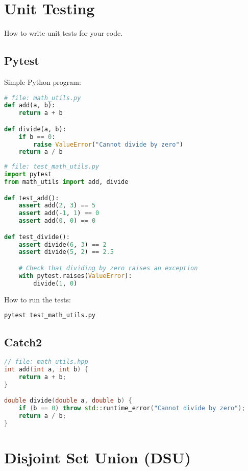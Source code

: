 \documentclass[12pt]{article}
\begin{document}
\section{Unit Testing}

How to write unit tests for your code.

\subsection{Pytest}

Simple Python program:

\begin{lstlisting}[language=Python]
# file: math_utils.py
def add(a, b):
    return a + b

def divide(a, b):
    if b == 0:
        raise ValueError("Cannot divide by zero")
    return a / b
\end{lstlisting}

\begin{lstlisting}[language=Python]
# file: test_math_utils.py
import pytest
from math_utils import add, divide

def test_add():
    assert add(2, 3) == 5
    assert add(-1, 1) == 0
    assert add(0, 0) == 0

def test_divide():
    assert divide(6, 3) == 2
    assert divide(5, 2) == 2.5

    # Check that dividing by zero raises an exception
    with pytest.raises(ValueError):
        divide(1, 0)

\end{lstlisting}

How to run the tests:

\begin{lstlisting}[language=bash]
pytest test_math_utils.py
\end{lstlisting}


\subsection{Catch2}

\begin{lstlisting}[language=C++]
// file: math_utils.hpp
int add(int a, int b) {
    return a + b;
}

double divide(double a, double b) {
    if (b == 0) throw std::runtime_error("Cannot divide by zero");
    return a / b;
}

\end{lstlisting}

\section{Disjoint Set Union (DSU)}
\end{document}
